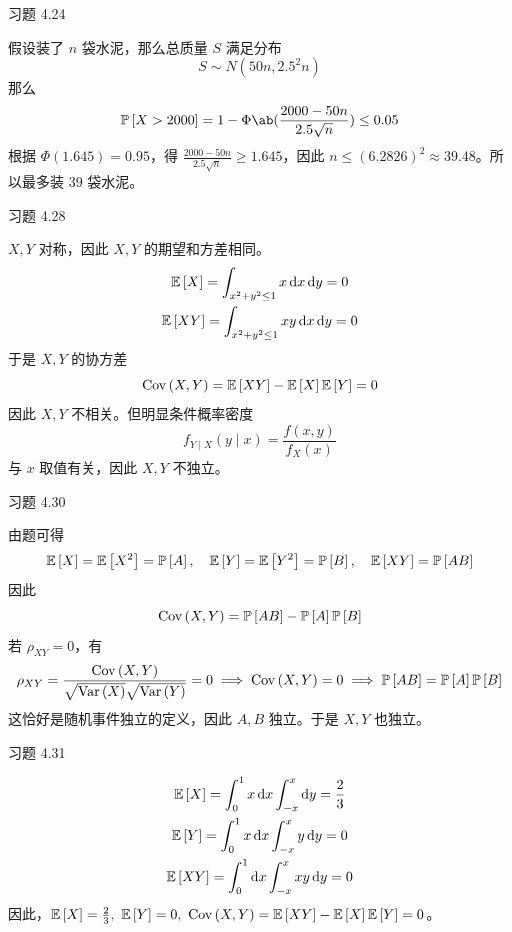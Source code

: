 \begin{problem}
    习题 4.24
    \begin{solution}
        假设装了 $n$ 袋水泥，那么总质量 $S$ 满足分布
        $$
        S \sim N(50 n, 2.5^2 n)
        $$
        那么
        $$
        \prob{X > 2000} = 1 - \Phi\ab(\frac{2000 - 50n}{2.5 \sqrt{n}}) \le 0.05
        $$
        根据 $\Phi(1.645) = 0.95$，得 $\frac{2000 - 50n}{2.5 \sqrt{n}} \ge 1.645$，因此 $n \le (6.2826)^2 \approx 39.48$。所以最多装 $39$ 袋水泥。
    \end{solution}
\end{problem}

\begin{problem}
    习题 4.28
    \begin{solution}
        $X, Y$ 对称，因此 $X, Y$ 的期望和方差相同。
        $$
        \begin{gathered}
            \operatorname{\mathbb{E}}\left[X\right] = \int_{x^2 + y^2 \le 1} x \dd{x} \dd{y} = 0 \\
            \operatorname{\mathbb{E}}\left[X Y\right] = \int_{x^2 + y^2 \le 1} x y \dd{x} \dd{y} = 0
        \end{gathered}
        $$
        于是 $X, Y$ 的协方差
        $$
        \operatorname{Cov}\left(X, Y\right) = \operatorname{\mathbb{E}}\left[X Y\right] - \operatorname{\mathbb{E}}\left[X\right] \operatorname{\mathbb{E}}\left[Y\right] = 0
        $$
        因此 $X, Y$ 不相关。但明显条件概率密度
        $$
        f_{Y \mid X}(y \mid x) = \frac{f(x, y)}{f_X(x)}
        $$
        与 $x$ 取值有关，因此 $X, Y$ 不独立。
    \end{solution}
\end{problem}

\begin{problem}
    习题 4.30
    \begin{solution}
        由题可得
        $$
        \operatorname{\mathbb{E}}\left[X\right] = \operatorname{\mathbb{E}}\left[X^2\right] = \operatorname{\mathbb{P}}\left[A\right], \quad \operatorname{\mathbb{E}}\left[Y\right] = \operatorname{\mathbb{E}}\left[Y^2\right] = \operatorname{\mathbb{P}}\left[B\right], \quad \operatorname{\mathbb{E}}\left[X Y\right] = \operatorname{\mathbb{P}}\left[A B\right]
        $$
        因此
        $$
        \operatorname{Cov}\left(X, Y\right) = \operatorname{\mathbb{P}}\left[A B\right] - \operatorname{\mathbb{P}}\left[A\right] \operatorname{\mathbb{P}}\left[B\right]
        $$
        若 $\rho_{XY} = 0$，有
        $$
        \rho_{X Y} = \frac{\operatorname{Cov}\left(X, Y\right)}{\sqrt{\operatorname{Var}\left(X\right)} \sqrt{\operatorname{Var}\left(Y\right)}} = 0 \implies \operatorname{Cov}\left(X, Y\right) = 0 \implies \operatorname{\mathbb{P}}\left[A B\right] = \operatorname{\mathbb{P}}\left[A\right] \operatorname{\mathbb{P}}\left[B\right]
        $$
        这恰好是随机事件独立的定义，因此 $A, B$ 独立。于是 $X, Y$ 也独立。
    \end{solution}
\end{problem}

\begin{problem}
    习题 4.31
    \begin{solution}
        $$
        \begin{gathered}
            \operatorname{\mathbb{E}}\left[X\right] = \int_{0}^{1} x \dd{x} \int_{-x}^{x} \dd{y} = \frac{2}{3} \\
            \operatorname{\mathbb{E}}\left[Y\right] = \int_{0}^{1} x \dd{x} \int_{-x}^{x} y \dd{y} = 0 \\
            \operatorname{\mathbb{E}}\left[X Y\right] = \int_{0}^{1} \dd{x} \int_{-x}^{x} x y \dd{y} = 0
        \end{gathered}
        $$
        因此，$\expect{X} = \frac{2}{3},\ \expect{Y} = 0,\ \cov{X}{Y} = \expect{X Y} - \expect{X} \expect{Y} = 0$。
    \end{solution}
\end{problem}

